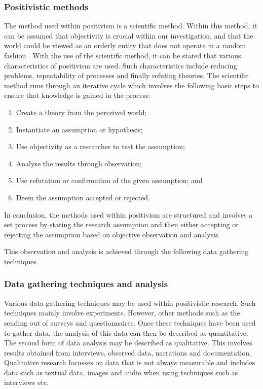 \subsubsection{Positivistic methods}
The method used within positivism is a scientific method. Within this method, it can be assumed that objectivity is crucial within our investigation, and that the world could be viewed as an orderly entity that does not operate in a random fashion \cite{OatesJ2006}. 
With the use of the scientific method, it can be stated that various characteristics of positivism are used. Such characteristics include reducing problems, repeatability of processes and finally refuting theories. 
The scientific method runs through an iterative cycle which involves the following basic steps to ensure that knowledge is gained in the process:
\begin{enumerate}
	\item Create a theory from the perceived world;
	\item Instantiate an assumption or hypothesis;
	\item Use objectivity as a researcher to test the assumption;
	\item Analyse the results through observation;
	\item Use refutation or confirmation of the given assumption; and
	\item Deem the assumption accepted or rejected.
\end{enumerate}

In conclusion, the methods used within positivism are structured and involves a set process by stating the research assumption and then either accepting or rejecting the assumption based on objective observation and analysis. 

This observation and analysis is achieved through the following data gathering techniques.

\subsubsection{Data gathering techniques and analysis}
Various data gathering techniques may be used within positivistic research. Such techniques mainly involve experiments. However, other methods such as the sending out of surveys and questionnaires. Once these techniques have been used to gather data, the analysis of this data can then be described as quantitative. The second form of data analysis may be described as qualitative. This involves results obtained from interviews, observed data, narrations and documentation. Qualitative research focusses on data that is not always measurable and includes data such as textual data, images and audio when using techniques such as interviews etc. 

